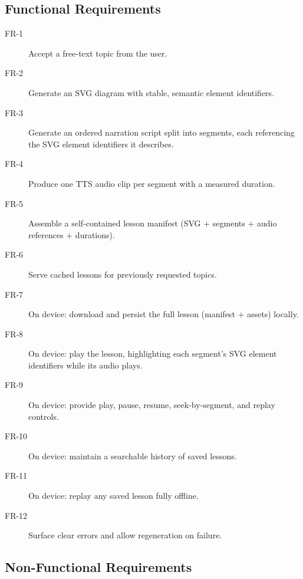 \subsection{Functional Requirements}

\begin{description}
  \item[FR-1] Accept a free-text topic from the user.
  \item[FR-2] Generate an SVG diagram with stable, semantic element
        identifiers.
  \item[FR-3] Generate an ordered narration script split into segments, each
        referencing the SVG element identifiers it describes.
  \item[FR-4] Produce one TTS audio clip per segment with a measured
        duration.
  \item[FR-5] Assemble a self-contained lesson manifest (SVG + segments +
        audio references + durations).
  \item[FR-6] Serve cached lessons for previously requested topics.
  \item[FR-7] On device: download and persist the full lesson (manifest +
        assets) locally.
  \item[FR-8] On device: play the lesson, highlighting each segment's SVG
        element identifiers while its audio plays.
  \item[FR-9] On device: provide play, pause, resume, seek-by-segment, and
        replay controls.
  \item[FR-10] On device: maintain a searchable history of saved lessons.
  \item[FR-11] On device: replay any saved lesson fully offline.
  \item[FR-12] Surface clear errors and allow regeneration on failure.
\end{description}

\subsection{Non-Functional Requirements}

